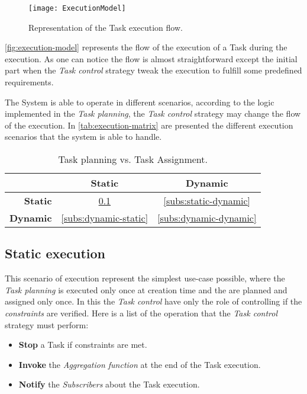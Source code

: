 \begin{figure}[htb]
    \centering
    \texttt{[image: ExecutionModel]}
    \caption{Representation of the Task execution flow.}
    \label{fig:execution-model}
\end{figure}
\autoref{fig:execution-model} represents the flow of the execution of a Task
during the execution. As one can notice the flow is almost straightforward except
the initial part when the \emph{Task control} strategy tweak the execution to
fulfill some predefined requirements.

The System is able to operate in different scenarios, according to the logic
implemented in the \emph{Task planning}, the \emph{Task control} strategy may
change the flow of the execution. In \autoref{tab:execution-matrix} are presented
the different execution scenarios that the system is able to handle.
\begin{table}[htb]
	\caption{Task planning vs. Task Assignment.}
	\label{tab:execution-matrix}
	\centering
	\begin{tabular}{r|c|c}
		 & \textbf{Static} & \textbf{Dynamic}\\
		\hline
		\textbf{Static} & \ref{subs:static-static} & \ref{subs:static-dynamic}\\
		\hline
		\textbf{Dynamic} & \ref{subs:dynamic-static} & \ref{subs:dynamic-dynamic}
	\end{tabular}
\end{table}



\subsection{Static execution}
\label{subs:static-static}
This scenario of execution represent the simplest use-case possible, where the
\emph{Task planning} is executed only once at creation time and the \utask{} are
planned and assigned only once. In this  the \emph{Task control} have
only the role of controlling if the \emph{constraints} are verified. Here is a
list of the operation that the \emph{Task control} strategy must perform:
\begin{itemize}
	\item \textbf{Stop} a Task if constraints are met.
	\item \textbf{Invoke} the \emph{Aggregation function} at the end of the Task
	execution.
	\item \textbf{Notify} the \emph{Subscribers} about the Task execution.
\end{itemize}



